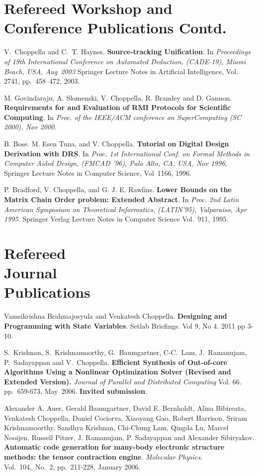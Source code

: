 \documentclass[11pt,margin,line]{res}
\begin{document}
\begin{resume}
\section{\sc Refereed Workshop and Conference Publications Contd.}

V.~Choppella and C.~T. Haynes. {\bf Source-tracking
  Unification}.  In {\em {Proceedings of 19th International
    Conference on Automated Deduction, (CADE-19), Miami
    Beach, USA, Aug~2003}} Springer Lecture Notes in
Artificial Intelligence, Vol. 2741, pp.~458--472, 2003.

M. Govindaraju, A. Slomenski, V. Choppella, R. Bramley and
  D. Gannon.  {\bf Requirements for and Evaluation of RMI
  Protocols for Scientific Computing}. In {\em {Proc. of the
  IEEE/ACM conference on SuperComputing (SC 2000), Nov
  2000}}.

B. Bose. M. Esen Tuna, and V. Choppella.  {\bf Tutorial on
Digital Design Derivation with DRS}.  In {\em {Proc. 1st
International Conf. on Formal Methods in Computer Aided
Design, (FMCAD '96), Palo Alto, CA, USA, Nov 1996}},
Springer Lecture Notes in Computer Science, Vol~1166, 1996.

P. Bradford, V. Choppella, and G. J. E. Rawlins.  %
{\bf Lower
  Bounds on the Matrix Chain Order problem: Extended
  Abstract}.  In {\em {Proc. 2nd Latin American Symposium on
    Theoretical Informatics, (LATIN'95), Valparaiso, Apr
    1995}}.  Springer Verlag Lecture Notes in Computer
Science Vol.~911, 1995.

\section{\sc Refereed\\ Journal\\ Publications}


Vamsikrishna Brahmajosyula and Venkatesh Choppella.  {\bf
  Designing and Programming with State Variables}.  Setlab
Briefings.  Vol 9, No 4. 2011 pp 3-10.


S.~Krishnan, S.~Krishnamoorthy, G.~Baumgartner, C-C.~Lam,
J.~Ramanujam, P.~Sadayappan and V.~Choppella.  {\bf
  Efficient Synthesis of Out-of-core Algorithms Using a
  Nonlinear Optimization Solver (Revised and Extended
  Version).}  {\em {Journal of Parallel and Distributed
    Computing}} Vol. 66. pp.~659-673, May~2006.  {\bf
  Invited submission}.

Alexander A. Auer, Gerald Baumgartner, David E. Bernholdt,
Alina Bibireata, Venkatesh Choppella, Daniel Cociorva,
Xiaoyang Gao, Robert Harrison, Sriram Krishnamoorthy,
Sandhya Krishnan, Chi-Chung Lam, Qingda Lu, Marcel Nooijen,
Russell Pitzer, J. Ramanujam, P. Sadayappan and Alexander
Sibiryakov.  {\bf Automatic code generation for many-body
electronic structure methods: the tensor contraction
engine}.  {\em Molecular Physics.} Vol.~104,~No.~2,
pp.~211-228, January 2006.


\end{resume}
\end{document}
